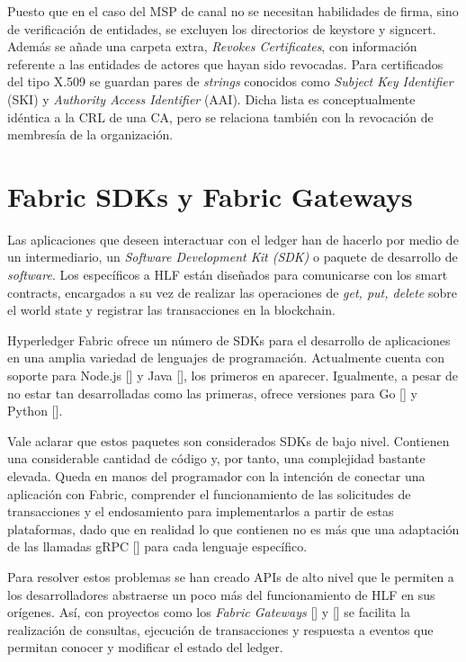 Puesto que en el caso del MSP de canal no se necesitan habilidades de firma, sino de verificaci\'on de entidades, se excluyen los directorios de keystore y signcert. Adem\'as se a\~nade una carpeta extra, \emph{Revokes Certificates}, con informaci\'on referente a las entidades de actores que hayan sido revocadas. Para certificados del tipo X.509 se guardan pares de \emph{strings} conocidos como \emph{Subject Key Identifier} (SKI) y \emph{Authority Access Identifier} (AAI). Dicha lista es conceptualmente id\'entica a la CRL de una CA, pero se relaciona tambi\'en con la revocaci\'on de membres\'ia de la organizaci\'on.


\section{Fabric SDKs y Fabric Gateways} 

Las aplicaciones que deseen interactuar con el ledger han de hacerlo por medio de un intermediario, un \emph{Software Development Kit (SDK)} o paquete de desarrollo de \emph{software}. Los espec\'ificos a HLF est\'an dise\~nados para comunicarse con los smart contracts, encargados a su vez de realizar las operaciones de \emph{get, put, delete} sobre el world state y registrar las transacciones en la blockchain.%

Hyperledger Fabric ofrece un n\'umero de SDKs para el desarrollo de aplicaciones en una amplia variedad de lenguajes de programaci\'on. Actualmente cuenta con soporte para Node.js [\cite{sdknode}] y Java [\cite{sdkjava}], los primeros en aparecer. Igualmente, a pesar de no estar tan desarrolladas como las primeras, ofrece versiones para Go [\cite{sdkgo}] y Python [\cite{sdkpython}].

Vale aclarar que estos paquetes son considerados SDKs de bajo nivel. Contienen una considerable cantidad de c\'odigo y, por tanto, una complejidad bastante elevada. Queda en manos del programador con la intenci\'on de conectar una aplicaci\'on con Fabric, comprender el funcionamiento de las solicitudes de transacciones y el endosamiento para implementarlos a partir de estas plataformas, dado que en realidad lo que contienen no es m\'as que una adaptaci\'on de las llamadas gRPC [\cite{grpc}] para cada lenguaje espec\'ifico.

Para resolver estos problemas se han creado APIs de alto nivel que le permiten a los desarrolladores abstraerse un poco m\'as del funcionamiento de HLF en sus or\'igenes. As\'i, con proyectos como los \emph{Fabric Gateways} [\cite{fabricgateway}] y [\cite{fabricgatewayjava}] se facilita la realizaci\'on de consultas, ejecuci\'on de transacciones y respuesta a eventos que permitan conocer y modificar el estado del ledger.


